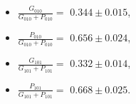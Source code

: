 \begin{itemize}
  \item $\frac{G_{010}}{G_{010} + P_{010}} =$ $0.344 \pm 0.015$,
  \item $\frac{P_{010}}{G_{010} + P_{010}} =$ $0.656 \pm 0.024$,
  \item $\frac{G_{101}}{G_{101} + P_{101}} =$ $0.332 \pm 0.014$,
  \item $\frac{P_{101}}{G_{101} + P_{101}} =$ $0.668 \pm 0.025$.
\end{itemize}
